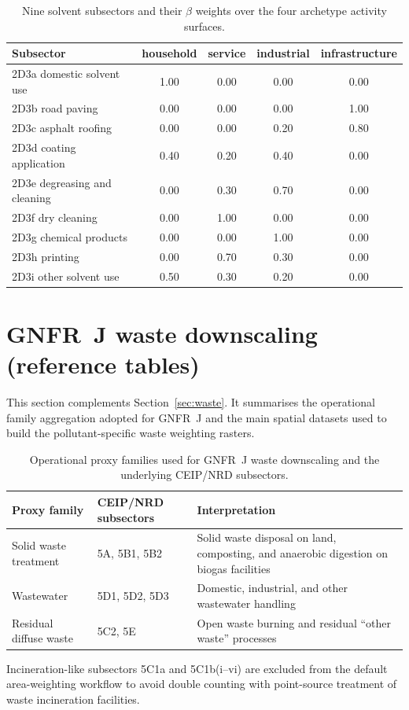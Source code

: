 \begin{table}[htbp]
  \centering
  \caption{Nine solvent subsectors and their $\beta$ weights over the
    four archetype activity surfaces.}
  \label{tab:solvents_subsectors_beta}
  \footnotesize
  \begin{tabular}{p{3.2cm}cccc}
    \hline
    Subsector & household & service & industrial & infrastructure \\
    \hline
    2D3a domestic solvent use & 1.00 & 0.00 & 0.00 & 0.00 \\
    2D3b road paving & 0.00 & 0.00 & 0.00 & 1.00 \\
    2D3c asphalt roofing & 0.00 & 0.00 & 0.20 & 0.80 \\
    2D3d coating application & 0.40 & 0.20 & 0.40 & 0.00 \\
    2D3e degreasing and cleaning & 0.00 & 0.30 & 0.70 & 0.00 \\
    2D3f dry cleaning & 0.00 & 1.00 & 0.00 & 0.00 \\
    2D3g chemical products & 0.00 & 0.00 & 1.00 & 0.00 \\
    2D3h printing & 0.00 & 0.70 & 0.30 & 0.00 \\
    2D3i other solvent use & 0.50 & 0.30 & 0.20 & 0.00 \\
    \hline
  \end{tabular}
\end{table}

\section{GNFR~J waste downscaling (reference tables)}
\label{app:waste_downscaling}

This section complements Section~\ref{sec:waste}. It summarises the
operational family aggregation adopted for GNFR~J and the main spatial
datasets used to build the pollutant-specific waste weighting rasters.

\begin{table}[htbp]
  \centering
  \caption{Operational proxy families used for GNFR~J waste downscaling
    and the underlying CEIP/NRD subsectors.}
  \label{tab:waste_families}
  \footnotesize
  \begin{tabular}{p{3.4cm}p{4.1cm}p{5.0cm}}
    \hline
    Proxy family & CEIP/NRD subsectors & Interpretation \\
    \hline
    Solid waste treatment &
    5A, 5B1, 5B2 &
    Solid waste disposal on land, composting, and anaerobic digestion on biogas facilities \\
    Wastewater &
    5D1, 5D2, 5D3 &
    Domestic, industrial, and other wastewater handling \\
    Residual diffuse waste &
    5C2, 5E &
    Open waste burning and residual ``other waste'' processes \\
    \hline
  \end{tabular}

  \medskip
  \footnotesize
  Incineration-like subsectors 5C1a and 5C1b(i--vi) are excluded from the
  default area-weighting workflow to avoid double counting with point-source
  treatment of waste incineration facilities.
\end{table}

